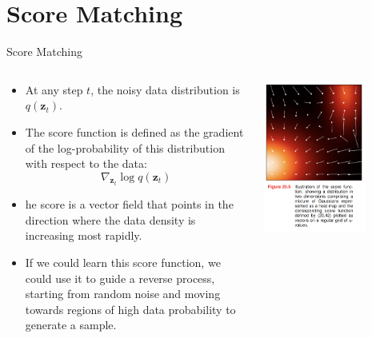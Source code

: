\documentclass[aspectratio=169,xcolor=dvipsnames]{beamer}
\theoremstyle{named}
\begin{document}
\section{Score Matching}

\begin{frame}{Score Matching}

\begin{columns}[T]
    \begin{column}{0.6\textwidth}
        \begin{itemize}
            \item At any step $t$, the noisy data distribution is $q(\mathbf{z}_t)$.
            \item The \alert{score function} is defined as the gradient of the log-probability of this distribution with respect to the data:
            $$ \nabla_{\mathbf{z}_t} \log q(\mathbf{z}_t) $$
            \item he score is a vector field that points in the direction where the data density is increasing most rapidly.
            \item If we could learn this score function, we could \alert{use it to guide a reverse process}, starting from random noise and moving towards regions of high data probability to generate a sample.
        \end{itemize}
    \end{column}
    \begin{column}{0.4\textwidth}
        \centering
        \includegraphics[width=0.7\textwidth]{score-matching.png}
    \end{column}
\end{columns}

\end{frame}
\end{document}
